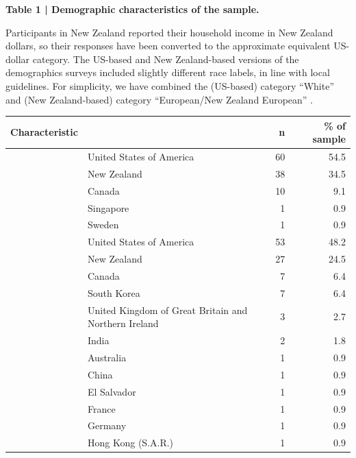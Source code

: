\documentclass[
]{article}
\begin{document}
\begin{ThreePartTable}
\begin{TableNotes}[para]
\item \textbf{Table 1 | Demographic characteristics of the sample. } 
\item Participants in New Zealand reported their household income in New Zealand dollars, so their responses have been converted to the approximate equivalent US-dollar category. The US-based and New Zealand-based versions of the demographics surveys included slightly different race labels, in line with local guidelines. For simplicity, we have combined the (US-based) category ``White''  and (New Zealand-based) category ``European/New Zealand European'' .
\end{TableNotes}
\begin{longtable}{llrr}
\toprule
Characteristic &   & n & \% of sample\\
\midrule
 & United States of America & 60 & 54.5\\
\cmidrule{2-4}\nopagebreak
 & New Zealand & 38 & 34.5\\
\cmidrule{2-4}\nopagebreak
 & Canada & 10 & 9.1\\
\cmidrule{2-4}\nopagebreak
 & Singapore & 1 & 0.9\\
\cmidrule{2-4}\nopagebreak
\multirow{-5}{*}{\raggedright\arraybackslash Country of residence} & Sweden & 1 & 0.9\\
\cmidrule{1-4}\pagebreak[0]
 & United States of America & 53 & 48.2\\
\cmidrule{2-4}\nopagebreak
 & New Zealand & 27 & 24.5\\
\cmidrule{2-4}\nopagebreak
 & Canada & 7 & 6.4\\
\cmidrule{2-4}\nopagebreak
 & South Korea & 7 & 6.4\\
\cmidrule{2-4}\nopagebreak
 & United Kingdom of Great Britain and Northern Ireland & 3 & 2.7\\
\cmidrule{2-4}\nopagebreak
 & India & 2 & 1.8\\
\cmidrule{2-4}\nopagebreak
 & Australia & 1 & 0.9\\
\cmidrule{2-4}\nopagebreak
 & China & 1 & 0.9\\
\cmidrule{2-4}\nopagebreak
 & El Salvador & 1 & 0.9\\
\cmidrule{2-4}\nopagebreak
 & France & 1 & 0.9\\
\cmidrule{2-4}\nopagebreak
 & Germany & 1 & 0.9\\
\cmidrule{2-4}\nopagebreak
 & Hong Kong (S.A.R.) & 1 & 0.9\\

\end{longtable}
\end{ThreePartTable}
\end{document}
